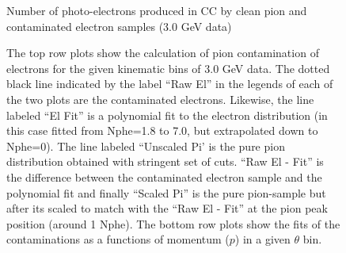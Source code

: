 
\begin{figure}[H]
\centering
{}
\label{fignphePiC} %
\caption[$N_{ph}$ from pion and electron samples]{Number of photo-electrons produced in CC by clean pion and contaminated electron samples (3.0 GeV data) %
}
\end{figure}








\begin{figure}[ht]
\centering
{}
\quad
{}
\quad
{}
\label{figpiCont}
\caption[Calculation of pion contamination and fits.]{The top row plots show the calculation of pion contamination of electrons for the given kinematic bins of 3.0 GeV data. The dotted black line indicated by the label ``Raw El'' in the legends of each of the two plots are the contaminated electrons. Likewise, the line labeled ``El Fit'' is a polynomial fit to the electron distribution (in this case fitted from Nphe=1.8 to 7.0, but extrapolated down to Nphe=0). The line labeled ``Unscaled Pi' is the pure pion distribution obtained with stringent set of cuts. ``Raw El - Fit'' is the difference between the contaminated electron sample and the polynomial fit and finally ``Scaled Pi'' is the pure pion-sample but after its scaled to match with the ``Raw El - Fit'' at the pion peak position (around 1 Nphe). The bottom row plots show the fits of the contaminations as a functions of momentum ($p$) in a given $\theta$ bin. }
\end{figure}







